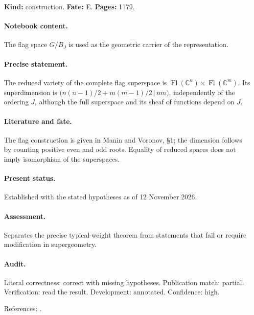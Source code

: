\label{item:1983-627.2}

\noindent\textbf{Kind:} construction. \textbf{Fate:} E. \textbf{Pages:} 1179.\par

\paragraph{Notebook content.} The flag space \(G/B_J\) is used as the geometric carrier of the representation.

\paragraph{Precise statement.} The reduced variety of the complete flag superspace is \(\operatorname{Fl}(\mathbb C^n)\times\operatorname{Fl}(\mathbb C^m)\). Its superdimension is \(\bigl(n(n-1)/2+m(m-1)/2\,\big|\,nm\bigr)\), independently of the ordering \(J\), although the full superspace and its sheaf of functions depend on \(J\).

\paragraph{Literature and fate.} The flag construction is given in Manin and Voronov, \S1; the dimension follows by counting positive even and odd roots. Equality of reduced spaces does not imply isomorphism of the superspaces.

\paragraph{Present status.} Established with the stated hypotheses as of 12 November 2026.

\paragraph{Assessment.} Separates the precise typical-weight theorem from statements that fail or require modification in supergeometry.

\paragraph{Audit.} Literal correctness: correct with missing hypotheses. Publication match: partial. Verification: read the result. Development: annotated. Confidence: high.

\noindent References: \citep{maninvoronov1988supercell}.\par

